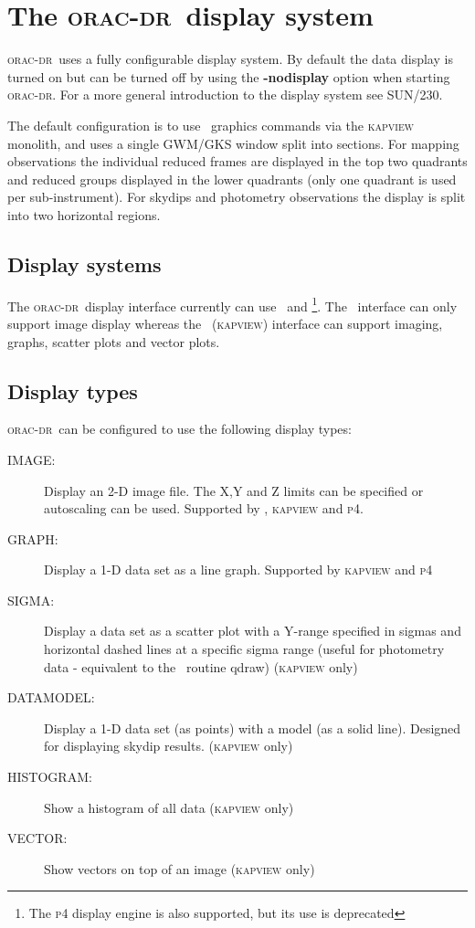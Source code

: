 \documentclass[twoside,11pt]{article}
\newcommand{\xref}[3]{#1}
\newcommand{\xlabel}[1]{}
\renewcommand{\_}{\texttt{\symbol{95}}}
\newcommand{\oracdr}{\xref{\textsc{orac-dr}}{sun230}{}}
\newcommand{\task}[1]{{\textsf{#1}}}
\newcommand{\Kappa}{\xref{{\sc{Kappa}}}{sun95}{}}
\newcommand{\SURF}{\xref{{\sc{Surf}}}{sun216}{}}
\newcommand{\gaia}{\xref{{\sc{Gaia}}}{sun214}{}}
\newcommand{\qdraw}{\xref{\task{qdraw}}{sun216}{QDRAW}}
\begin{document}
\section{The \oracdr\ display system\xlabel{the_orac_display_system}}

\oracdr\ uses a fully configurable display system. By default the data
display is turned on but can be turned off by using the \textbf{-nodisplay}
option when starting \oracdr. For a more general introduction to the
display system see \xref{SUN/230}{sun230}{display_system}.

The default configuration is to use \Kappa\ graphics commands via the
\textsc{kapview} monolith, and uses a single
\xref{GWM}{sun219}{}/\xref{GKS}{sun83}{} window split into sections. For
mapping observations the individual reduced frames are displayed in the top
two quadrants and reduced groups displayed in the lower quadrants (only one
quadrant is used per sub-instrument). For skydips and photometry observations
the display is split into two horizontal regions.

\subsection{Display systems\xlabel{display_systems}}

The \oracdr\ display interface currently can use \Kappa\ and
\gaia\footnote{The \xref{\textsc{p4}}{sun27}{} display engine is also supported, but
its use is deprecated}. The \gaia\ interface can only support image display
whereas the \Kappa\ (\textsc{kapview}) interface can support imaging, graphs, scatter
plots and vector plots.

\subsection{Display types\xlabel{display_types}}

\oracdr\ can be configured to use the following display types:

\begin{description}
\item[IMAGE:] Display an 2-D image file. The X,Y and Z limits can be
specified or autoscaling can be used. Supported by \gaia, \textsc{kapview} and \textsc{p4}.
\item[GRAPH:] Display a 1-D data set as a line graph. Supported by
\textsc{kapview} and  \textsc{p4}
\item[SIGMA:] Display a data set as a scatter plot with a Y-range specified in
sigmas and horizontal dashed lines at a specific sigma range
(useful for photometry data - equivalent to the \SURF\ routine \qdraw) (\textsc{kapview} only)
\item[DATAMODEL:] Display a 1-D data set (as points) with a model (as a solid
line). Designed for displaying skydip results. (\textsc{kapview} only)
\item[HISTOGRAM:] Show a histogram of all data (\textsc{kapview} only)
\item[VECTOR:] Show vectors on top of an image (\textsc{kapview} only)
\end{description}
\end{document}
